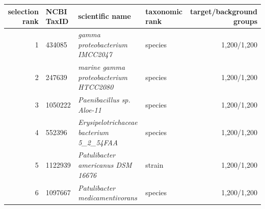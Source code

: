 \begin{tabular}{@{}rlllr@{}}
\toprule
\textbf{selection rank} & \textbf{NCBI TaxID} & \textbf{scientific name} & \textbf{taxonomic rank} & \textbf{target/background groups} \\
\midrule
1 & 434085 & \textit{gamma proteobacterium IMCC2047} & species & 1,200/1,200 \\
2 & 247639 & \textit{marine gamma proteobacterium HTCC2080} & species & 1,200/1,200 \\
3 & 1050222 & \textit{Paenibacillus sp. Aloe-11} & species & 1,200/1,200 \\
4 & 552396 & \textit{Erysipelotrichaceae bacterium 5\_2\_54FAA} & species & 1,200/1,200 \\
5 & 1122939 & \textit{Patulibacter americanus DSM 16676} & strain & 1,200/1,200 \\
6 & 1097667 & \textit{Patulibacter medicamentivorans} & species & 1,200/1,200 \\
\bottomrule
\end{tabular}
